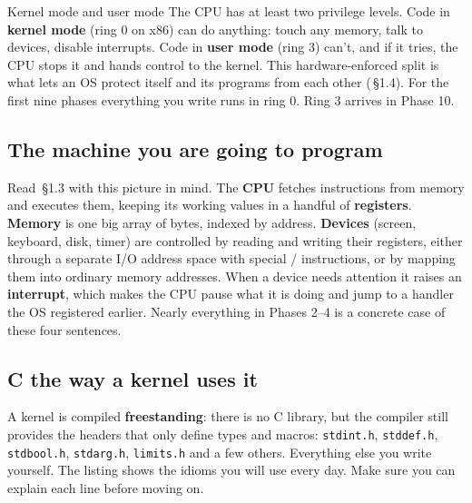 \documentclass[11pt,a4paper]{article}
\begin{document}
\begin{conceptbox}{Kernel mode and user mode}
The CPU has at least two privilege levels. Code in \textbf{kernel mode} (ring 0 on x86) can do anything: touch any
memory, talk to devices, disable interrupts. Code in \textbf{user mode} (ring 3) can't, and if it tries, the CPU
stops it and hands control to the kernel. This hardware-enforced split is what lets an OS protect itself and its
programs from each other (\OSC\,\S1.4). For the first nine phases everything you write runs in ring 0. Ring 3 arrives
in Phase 10.
\end{conceptbox}

\subsection{The machine you are going to program}

Read \MOS\,\S1.3 with this picture in mind. The \textbf{CPU} fetches instructions from memory and executes them,
keeping its working values in a handful of \textbf{registers}. \textbf{Memory} is one big array of bytes, indexed by
address. \textbf{Devices} (screen, keyboard, disk, timer) are controlled by reading and writing their registers,
either through a separate I/O address space with special / instructions, or by mapping them into
ordinary memory addresses. When a device needs attention it raises an \textbf{interrupt}, which makes the CPU pause
what it is doing and jump to a handler the OS registered earlier. Nearly everything in Phases 2--4 is a concrete case
of these four sentences.

\subsection{C the way a kernel uses it}

A kernel is compiled \textbf{freestanding}: there is no C library, but the compiler still provides the headers that
only define types and macros: \texttt{stdint.h}, \texttt{stddef.h}, \texttt{stdbool.h}, \texttt{stdarg.h},
\texttt{limits.h} and a few others. Everything else you write yourself. The listing shows the idioms you will use every
day. Make sure you can explain each line before moving on.
\end{document}
